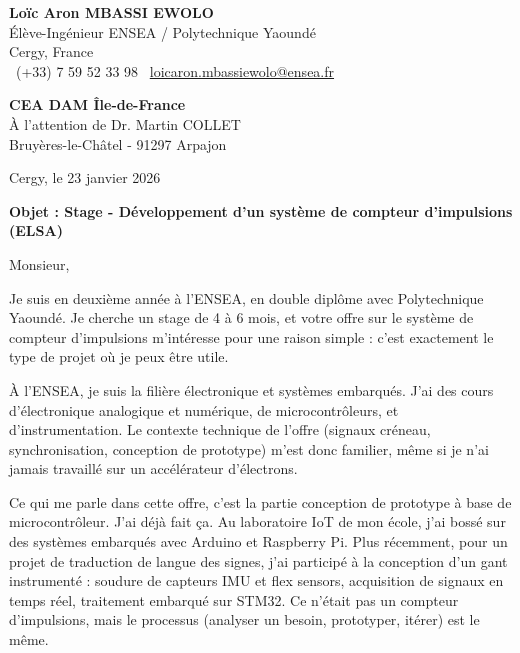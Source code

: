 \documentclass[a4paper,11pt]{article}
\begin{document}
\noindent
\textbf{Loïc Aron MBASSI EWOLO} \\
Élève-Ingénieur ENSEA / Polytechnique Yaoundé \\
Cergy, France \\
\faPhone\ (+33) 7 59 52 33 98 \quad \faEnvelope\ \href{mailto:loicaron.mbassiewolo@ensea.fr}{loicaron.mbassiewolo@ensea.fr}

\vspace{0.6cm}

\noindent
\textbf{CEA DAM Île-de-France} \\
À l'attention de Dr. Martin COLLET \\
Bruyères-le-Châtel - 91297 Arpajon

\hfill Cergy, le 23 janvier 2026

\vspace{0.5cm}

\noindent\textbf{Objet : Stage - Développement d'un système de compteur d'impulsions (ELSA)}

\vspace{0.4cm}

Monsieur,

\vspace{0.3cm}

Je suis en deuxième année à l'ENSEA, en double diplôme avec Polytechnique Yaoundé. Je cherche un stage de 4 à 6 mois, et votre offre sur le système de compteur d'impulsions m'intéresse pour une raison simple : c'est exactement le type de projet où je peux être utile.

\vspace{0.25cm}

À l'ENSEA, je suis la filière électronique et systèmes embarqués. J'ai des cours d'électronique analogique et numérique, de microcontrôleurs, et d'instrumentation. Le contexte technique de l'offre (signaux créneau, synchronisation, conception de prototype) m'est donc familier, même si je n'ai jamais travaillé sur un accélérateur d'électrons.

\vspace{0.25cm}

Ce qui me parle dans cette offre, c'est la partie conception de prototype à base de microcontrôleur. J'ai déjà fait ça. Au laboratoire IoT de mon école, j'ai bossé sur des systèmes embarqués avec Arduino et Raspberry Pi. Plus récemment, pour un projet de traduction de langue des signes, j'ai participé à la conception d'un gant instrumenté : soudure de capteurs IMU et flex sensors, acquisition de signaux en temps réel, traitement embarqué sur STM32. Ce n'était pas un compteur d'impulsions, mais le processus (analyser un besoin, prototyper, itérer) est le même.
\end{document}
